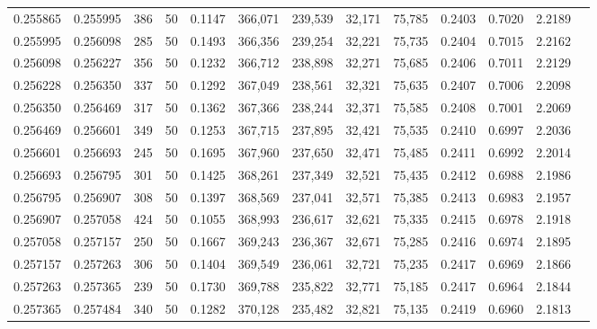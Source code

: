 \begin{tabular}{rrrrrrrrrrrrr}
0.255865 & 0.255995 &   386 &  50 &                                     0.1147 & 366,071 & 239,539 &  32,171 &  75,785 & 0.2403 & 0.7020 & 2.2189 \\
0.255995 & 0.256098 &   285 &  50 &                                     0.1493 & 366,356 & 239,254 &  32,221 &  75,735 & 0.2404 & 0.7015 & 2.2162 \\
0.256098 & 0.256227 &   356 &  50 &                                     0.1232 & 366,712 & 238,898 &  32,271 &  75,685 & 0.2406 & 0.7011 & 2.2129 \\
0.256228 & 0.256350 &   337 &  50 &                                     0.1292 & 367,049 & 238,561 &  32,321 &  75,635 & 0.2407 & 0.7006 & 2.2098 \\
0.256350 & 0.256469 &   317 &  50 &                                     0.1362 & 367,366 & 238,244 &  32,371 &  75,585 & 0.2408 & 0.7001 & 2.2069 \\
0.256469 & 0.256601 &   349 &  50 &                                     0.1253 & 367,715 & 237,895 &  32,421 &  75,535 & 0.2410 & 0.6997 & 2.2036 \\
0.256601 & 0.256693 &   245 &  50 &                                     0.1695 & 367,960 & 237,650 &  32,471 &  75,485 & 0.2411 & 0.6992 & 2.2014 \\
0.256693 & 0.256795 &   301 &  50 &                                     0.1425 & 368,261 & 237,349 &  32,521 &  75,435 & 0.2412 & 0.6988 & 2.1986 \\
0.256795 & 0.256907 &   308 &  50 &                                     0.1397 & 368,569 & 237,041 &  32,571 &  75,385 & 0.2413 & 0.6983 & 2.1957 \\
0.256907 & 0.257058 &   424 &  50 &                                     0.1055 & 368,993 & 236,617 &  32,621 &  75,335 & 0.2415 & 0.6978 & 2.1918 \\
0.257058 & 0.257157 &   250 &  50 &                                     0.1667 & 369,243 & 236,367 &  32,671 &  75,285 & 0.2416 & 0.6974 & 2.1895 \\
0.257157 & 0.257263 &   306 &  50 &                                     0.1404 & 369,549 & 236,061 &  32,721 &  75,235 & 0.2417 & 0.6969 & 2.1866 \\
0.257263 & 0.257365 &   239 &  50 &                                     0.1730 & 369,788 & 235,822 &  32,771 &  75,185 & 0.2417 & 0.6964 & 2.1844 \\
0.257365 & 0.257484 &   340 &  50 &                                     0.1282 & 370,128 & 235,482 &  32,821 &  75,135 & 0.2419 & 0.6960 & 2.1813 \\

\end{tabular}
